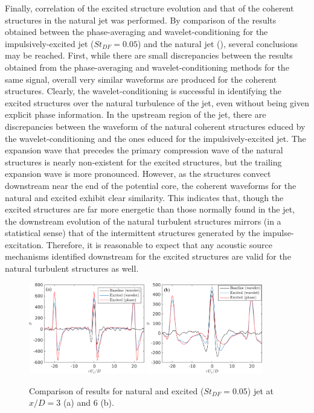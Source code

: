 Finally, correlation of the excited structure evolution and that of the coherent structures in the natural jet was performed.
By comparison of the results obtained between the phase-averaging and wavelet-conditioning for the impulsively-excited jet ($St_{DF} = 0.05$) and the natural jet (), several conclusions may be reached.
First, while there are small discrepancies between the results obtained from the phase-averaging and wavelet-conditioning methods for the same signal, overall very similar waveforms are produced for the coherent structures.
Clearly, the wavelet-conditioning is successful in identifying the excited structures over the natural turbulence of the jet, even without being given explicit phase information.
In the upstream region of the jet, there are discrepancies between the waveform of the natural coherent structures educed by the wavelet-conditioning and the ones educed for the impulsively-excited jet.
The expansion wave that precedes the primary compression wave of the natural structures is nearly non-existent for the excited structures, but the trailing expansion wave is more pronounced.
However, as the structures convect downstream near the end of the potential core, the coherent waveforms for the natural and excited exhibit clear similarity.
This indicates that, though the excited structures are far more energetic than those normally found in the jet, the downstream evolution of the natural turbulent structures mirrors (in a statistical sense) that of the intermittent structures generated by the impulse-excitation.
Therefore, it is reasonable to expect that any acoustic source mechanisms identified downstream for the excited structures are valid for the natural turbulent structures as well.
\begin{figure}
	\centering
	\includegraphics[width=0.45\textwidth]{Figures/conditioning/Phase-wavelet_comparison_x3D_pa.png} %
	\includegraphics[width=0.45\textwidth]{Figures/conditioning/Phase-wavelet_comparison_x6D_pa.png} 
	\caption{Comparison of results for natural and excited ($St_{DF} = 0.05$) jet at $x/D = 3$ (a) and $6$ (b).}
	\label{fig:phase-wavelet_comparison}
\end{figure}

